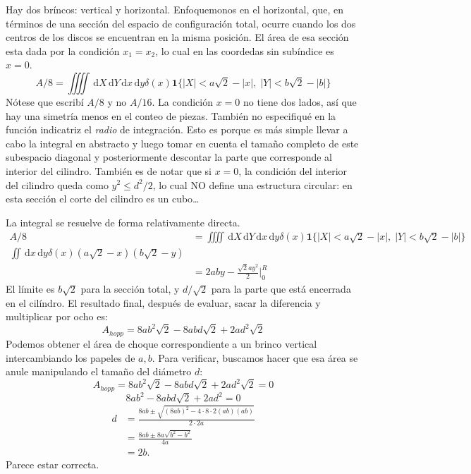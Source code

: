 \documentclass[a4paper,10pt]{article}
\newcommand{\rd}{\, \mathrm{d}}
\newcommand{\Indi}{\mathbf{1}}
\begin{document}
Hay dos bríncos: vertical y horizontal. Enfoquemonos en el horizontal,
que, en términos de una sección del espacio de configuración total,
ocurre cuando los dos centros de los discos se encuentran en la misma
posición. El área de esa 
sección  esta dada por la condición $x_1=x_2$, lo cual en las coordedas
sin subíndice es $x=0$.
\begin{equation}
A/8 =\iiiint \rd X \rd Y \rd x \rd y \delta(x)
\Indi \{ |X|<a\sqrt{2}-|x|,\;  |Y|<b\sqrt{2}-|b|\}
\end{equation}
Nótese que escribí $A/8$ y no $A/16$. La condición $x=0$ no tiene
dos lados, así que hay una simetría menos en el conteo de piezas.
También no especifiqué en la función indicatriz el \emph{radio}
de integración. Esto es porque es más simple llevar a cabo la 
integral en abstracto y luego tomar en cuenta el tamaño completo
de este subespacio diagonal y posteriormente descontar la parte
que corresponde al interior del cilindro. También es de 
notar que si $x=0$, la condición del interior del
cilindro queda como $y^2\leq d^2/2$, lo cual NO define una estructura
circular: en esta sección el corte del cilindro es un cubo\ldots

La integral se resuelve de forma relativamente directa.
\begin{equation}
\begin{split}
A/8 &=\iiiint \rd X \rd Y \rd x \rd y \delta(x)
\Indi \{ |X|<a\sqrt{2}-|x|,\;  |Y|<b\sqrt{2}-|b|\}\\
\iint \rd x \rd y \delta (x) (a\sqrt{2}-x)(b\sqrt{2}-y) \\
&=2aby-\frac{\sqrt{2}ay^2}{2}\bigg\vert_0^{R}
\end{split}
\end{equation}
El límite es $b\sqrt{2}$ para la sección total, y $d/\sqrt{2}$ 
para la parte que está encerrada en el cilíndro. El resultado
final, después de evaluar, sacar la diferencia y
multiplicar por ocho es:
\begin{equation}
A_{hopp}=8ab^2\sqrt{2}-8abd\sqrt{2}+2ad^2\sqrt{2}
\end{equation}
Podemos obtener el área de choque correspondiente a un brinco
vertical intercambiando los papeles de $a,b$.
Para verificar, buscamos hacer que esa área se anule 
manipulando el tamaño del diámetro $d$:
\begin{equation}
A_{hopp}=8ab^2\sqrt{2}-8abd\sqrt{2}+2ad^2\sqrt{2}=0
\end{equation}
\begin{equation}
8ab^2-8abd\sqrt{2}+2ad^2=0
\end{equation}
\begin{equation}
\begin{split}
d&=\frac{8ab\pm  \sqrt{(8ab)^2-4\cdot 8 \cdot 2 (ab)(ab)}}{2\cdot 2 a}\\
&=\frac{8ab\pm  8a \sqrt{b^2-b^2}}{4 a}\\
&=2b.
\end{split}
\end{equation}
Parece estar correcta.
\end{document}
